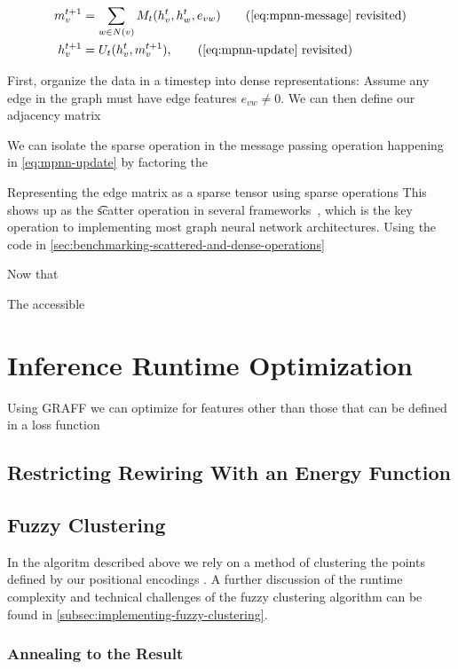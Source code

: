 \documentclass[../main.tex]{subfiles}
\begin{document}
    \begin{align*}
        m^{t+1}_v &= \sum_{w \in N(v)} M_t(h^t_v, h^t_w, e_{vw})\tag{\ref{eq:mpnn-message} revisited}\\
        h^{t+1}_v &= U_t(h_v^t, m_v^{t + 1}),\tag{\ref{eq:mpnn-update} revisited}
    \end{align*}

    First, organize the data in a timestep into dense representations: Assume any edge in the graph must have edge features $e_{vw} \neq 0$.
    We can then define our adjacency matrix

    We can isolate the sparse operation in the message passing operation happening in \autoref{eq:mpnn-update} by factoring the

    Representing the edge matrix as a sparse tensor using sparse operations
    This shows up as the \t{scatter} operation in several frameworks~\cite{TorchTensorScatter, JaxLaxScatter}, which is the key operation to implementing most graph neural network architectures.
    Using the code in \autoref{sec:benchmarking-scattered-and-dense-operations}


    Now that

    The accessible

    \section{Inference Runtime Optimization}\label{sec:inference-runtime-optimization}
    Using GRAFF we can optimize for features other than those that can be defined in a loss function

    \subsection{Restricting Rewiring With an Energy Function}\label{subsec:runtime-energy}
    \subsection{Fuzzy Clustering}\label{subsec:fuzzy-clustering}
    In the algoritm described above we rely on a method of clustering the points defined by our positional encodings .
    A further discussion of the runtime complexity and technical challenges of the fuzzy clustering algorithm can be found in \autoref{subsec:implementing-fuzzy-clustering}.

    \subsubsection{Annealing to the Result}\label{subsubsec:annealing-to-the-result}
\end{document}
